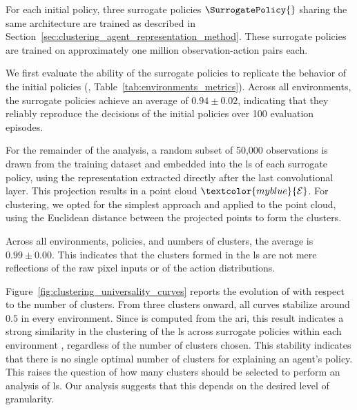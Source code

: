 For each initial policy, three surrogate policies $\SurrogatePolicy{}$ sharing the same architecture are trained as described in Section~\ref{sec:clustering_agent_representation_method}.
These surrogate policies are trained on approximately one million observation-action pairs each.


\FloatBarrier

We first evaluate the ability of the surrogate policies to replicate the behavior of the initial policies (\BehaviorReconstructionName, Table~\ref{tab:environments_metrics}).
Across all environments, the surrogate policies achieve an average \BehaviorReconstructionName of $0.94 \pm 0.02$, indicating that they reliably reproduce the decisions of the initial policies over 100 evaluation episodes.

For the remainder of the analysis, a random subset of 50,000 observations is drawn from the training dataset and embedded into the \gls{ls} of each surrogate policy, using the representation extracted directly after the last convolutional layer.
This projection results in a point cloud $\textcolor{myblue}{\mathcal{E}}$.
For clustering, we opted for the simplest approach and applied  \cite{macqueen1967multivariate} to the point cloud, using the Euclidean distance between the projected points to form the clusters.

Across all environments, policies, and numbers of clusters, the average \AbstractionScoreName is $0.99 \pm 0.00$.
This indicates that the clusters formed in the \gls{ls} are not mere reflections of the raw pixel inputs or of the action distributions.





Figure~\ref{fig:clustering_universality_curves} reports the evolution of \ClusteringUniversalityName with respect to the number of clusters.
From three clusters onward, all curves stabilize around $0.5$ in every environment.
Since \ClusteringUniversalityName is computed from the \gls{ari}, this result indicates a strong similarity in the clustering of the \gls{ls} across surrogate policies within each environment \cite{amezquita2020orchestrating}, regardless of the number of clusters chosen.
This stability indicates that there is no single optimal number of clusters for explaining an agent's policy.
This raises the question of how many clusters should be selected to perform an analysis of \gls{ls}.
Our analysis suggests that this depends on the desired level of granularity.

